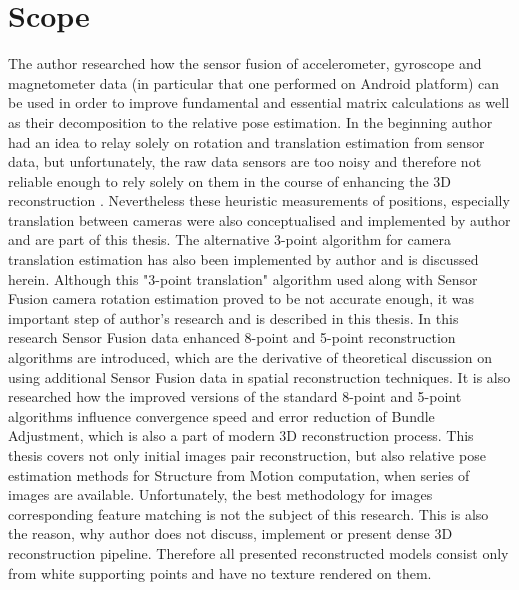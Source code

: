 \section{Scope}
The author researched how the sensor fusion of accelerometer, gyroscope and magnetometer data (in particular that one performed on Android platform) can be used in order to improve fundamental and essential matrix calculations as well as their decomposition to the relative pose estimation. In the beginning author had an idea to relay solely on rotation and translation estimation from sensor data, but unfortunately, the raw data sensors are too noisy and therefore not reliable enough to rely solely on them in the course of enhancing the 3D reconstruction \cite{website:androidSensorFusion}. Nevertheless these heuristic measurements of positions, especially translation between cameras were also conceptualised and implemented by author and are part of this thesis. The alternative 3-point algorithm for camera translation estimation has also been implemented by author and is discussed herein. Although this "3-point translation" algorithm used along with Sensor Fusion camera rotation estimation proved to be not accurate enough, it was important step of author's research and is described in this thesis. 
In this research Sensor Fusion data enhanced 8-point and 5-point reconstruction algorithms are introduced, which are the derivative of theoretical discussion on using additional Sensor Fusion data in spatial reconstruction techniques. It is also researched how the improved versions of the standard 8-point and 5-point algorithms influence convergence speed and error reduction of Bundle Adjustment, which is also a part of modern 3D reconstruction process. This thesis covers not only initial images pair reconstruction, but also relative pose estimation methods for Structure from Motion computation, when series of images are available. Unfortunately, the best methodology for images corresponding feature matching is not the subject of this research. This is also the reason, why author does not discuss, implement or present dense 3D reconstruction pipeline. Therefore all presented reconstructed models consist only from white supporting points and have no texture rendered on them.

